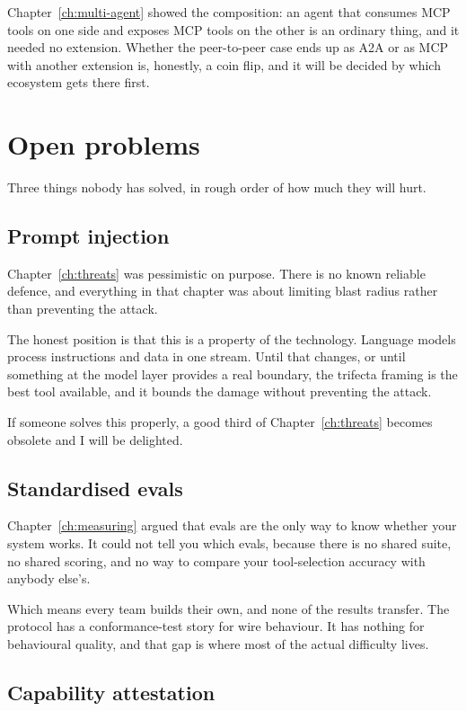 Chapter~\ref{ch:multi-agent} showed the composition: an agent that consumes MCP
tools on one side and exposes MCP tools on the other is an ordinary thing, and it
needed no extension. Whether the peer-to-peer case ends up as A2A or as MCP with
another extension is, honestly, a coin flip, and it will be decided by which ecosystem gets there first.

\section{Open problems}

Three things nobody has solved, in rough order of how much they will hurt.

\subsection{Prompt injection}

Chapter~\ref{ch:threats} was pessimistic on purpose. There is no known reliable
defence, and everything in that chapter was about limiting blast radius rather
than preventing the attack.

The honest position is that this is a property of the technology. Language models process instructions and data in
one stream. Until that changes, or until something at the model layer provides a
real boundary, the trifecta framing is the best tool available, and it bounds the damage
without preventing the attack.

If someone solves this properly, a good third of Chapter~\ref{ch:threats} becomes
obsolete and I will be delighted.

\subsection{Standardised evals}

Chapter~\ref{ch:measuring} argued that evals are the only way to know whether
your system works. It could not tell you which evals, because there is no shared
suite, no shared scoring, and no way to compare your tool-selection accuracy with
anybody else's.

Which means every team builds their own, and none of the results transfer. The
protocol has a conformance-test story for wire behaviour. It has nothing for
behavioural quality, and that gap is where most of the actual difficulty lives.

\subsection{Capability attestation}

